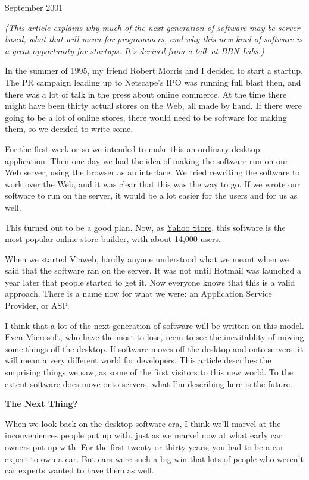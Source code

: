 September 2001

\emph{(This article explains why much of the next generation of software
may be server-based, what that will mean for programmers, and why this
new kind of software is a great opportunity for startups. It's derived
from a talk at BBN Labs.)}

In the summer of 1995, my friend Robert Morris and I decided to start a
startup. The PR campaign leading up to Netscape's IPO was running full
blast then, and there was a lot of talk in the press about online
commerce. At the time there might have been thirty actual stores on the
Web, all made by hand. If there were going to be a lot of online stores,
there would need to be software for making them, so we decided to write
some.

For the first week or so we intended to make this an ordinary desktop
application. Then one day we had the idea of making the software run on
our Web server, using the browser as an interface. We tried rewriting
the software to work over the Web, and it was clear that this was the
way to go. If we wrote our software to run on the server, it would be a
lot easier for the users and for us as well.

This turned out to be a good plan. Now, as
\href{http://store.yahoo.com}{Yahoo Store}, this software is the most
popular online store builder, with about 14,000 users.

When we started Viaweb, hardly anyone understood what we meant when we
said that the software ran on the server. It was not until Hotmail was
launched a year later that people started to get it. Now everyone knows
that this is a valid approach. There is a name now for what we were: an
Application Service Provider, or ASP.

I think that a lot of the next generation of software will be written on
this model. Even Microsoft, who have the most to lose, seem to see the
inevitablity of moving some things off the desktop. If software moves
off the desktop and onto servers, it will mean a very different world
for developers. This article describes the surprising things we saw, as
some of the first visitors to this new world. To the extent software
does move onto servers, what I'm describing here is the future.

\textbf{The Next Thing?}

When we look back on the desktop software era, I think we'll marvel at
the inconveniences people put up with, just as we marvel now at what
early car owners put up with. For the first twenty or thirty years, you
had to be a car expert to own a car. But cars were such a big win that
lots of people who weren't car experts wanted to have them as well.

